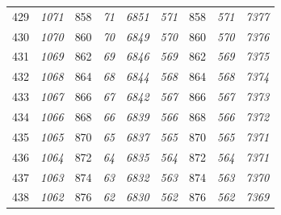 \documentclass[10pt,fleqn]{article}
\begin{document}
\begin{longtable}{c|cccccccc}
429 & {\color{blue} \it 1071 \rm} & {\color{black} 858} & {\color{blue} \it 71 \rm} & {\color{blue} \it 6851 \rm} & {\color{blue} \it 571 \rm} & {\color{black} 858} & {\color{blue} \it 571 \rm} & {\color{blue} \it 7377 \rm} \\
430 & {\color{blue} \it 1070 \rm} & {\color{black} 860} & {\color{blue} \it 70 \rm} & {\color{blue} \it 6849 \rm} & {\color{blue} \it 570 \rm} & {\color{black} 860} & {\color{blue} \it 570 \rm} & {\color{blue} \it 7376 \rm} \\
431 & {\color{blue} \it 1069 \rm} & {\color{black} 862} & {\color{blue} \it 69 \rm} & {\color{blue} \it 6846 \rm} & {\color{blue} \it 569 \rm} & {\color{black} 862} & {\color{blue} \it 569 \rm} & {\color{blue} \it 7375 \rm} \\
432 & {\color{blue} \it 1068 \rm} & {\color{black} 864} & {\color{blue} \it 68 \rm} & {\color{blue} \it 6844 \rm} & {\color{blue} \it 568 \rm} & {\color{black} 864} & {\color{blue} \it 568 \rm} & {\color{blue} \it 7374 \rm} \\
433 & {\color{blue} \it 1067 \rm} & {\color{black} 866} & {\color{blue} \it 67 \rm} & {\color{blue} \it 6842 \rm} & {\color{blue} \it 567 \rm} & {\color{black} 866} & {\color{blue} \it 567 \rm} & {\color{blue} \it 7373 \rm} \\
434 & {\color{blue} \it 1066 \rm} & {\color{black} 868} & {\color{blue} \it 66 \rm} & {\color{blue} \it 6839 \rm} & {\color{blue} \it 566 \rm} & {\color{black} 868} & {\color{blue} \it 566 \rm} & {\color{blue} \it 7372 \rm} \\
435 & {\color{blue} \it 1065 \rm} & {\color{black} 870} & {\color{blue} \it 65 \rm} & {\color{blue} \it 6837 \rm} & {\color{blue} \it 565 \rm} & {\color{black} 870} & {\color{blue} \it 565 \rm} & {\color{blue} \it 7371 \rm} \\
436 & {\color{blue} \it 1064 \rm} & {\color{black} 872} & {\color{blue} \it 64 \rm} & {\color{blue} \it 6835 \rm} & {\color{blue} \it 564 \rm} & {\color{black} 872} & {\color{blue} \it 564 \rm} & {\color{blue} \it 7371 \rm} \\
437 & {\color{blue} \it 1063 \rm} & {\color{black} 874} & {\color{blue} \it 63 \rm} & {\color{blue} \it 6832 \rm} & {\color{blue} \it 563 \rm} & {\color{black} 874} & {\color{blue} \it 563 \rm} & {\color{blue} \it 7370 \rm} \\
438 & {\color{blue} \it 1062 \rm} & {\color{black} 876} & {\color{blue} \it 62 \rm} & {\color{blue} \it 6830 \rm} & {\color{blue} \it 562 \rm} & {\color{black} 876} & {\color{blue} \it 562 \rm} & {\color{blue} \it 7369 \rm} \\

\end{longtable}
\end{document}
